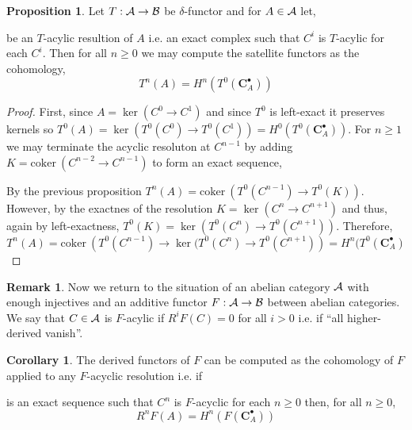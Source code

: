 \documentclass[12pt]{extarticle}
\newcommand{\coker}[1]{\mathrm{coker}\: #1}
\theoremstyle{definition}
\newtheorem{proposition}[theorem]{Proposition}
\newtheorem{corollary}[theorem]{Corollary}
\newtheorem{remark}{Remark}
\renewcommand{\bf}[1]{\mathbf{#1}}
\begin{document}
\begin{proposition}
Let $T : \mathcal{A} \to \mathcal{B}$ be $\delta$-functor and for $A \in \mathcal{A}$ let,
\begin{center}
\end{center}
be an $T$-acylic resultion of $A$ i.e. an exact complex such that $C^i$ is $T$-acylic for each $C^i$. Then for all $n \ge 0$ we may compute the satellite functors as the cohomology,
\[ T^n(A) = H^n(T^0(\bf{C}_A^\bullet)) \]
\end{proposition}

\begin{proof}
First, since $A = \ker{(C^0 \to C^1)}$ and since $T^0$ is left-exact it preserves kernels so $T^0(A) = \ker{(T^0(C^0) \to T^0(C^1))} = H^0(T^0(\bf{C}_A^\bullet))$. For $n \ge 1$ we may terminate the acyclic resoluton at $C^{n-1}$ by adding $K = \coker{(C^{n-2} \to C^{n-1})}$ to form an exact sequence,
\begin{center}
\end{center}
By the previous proposition $T^n(A) = \coker{(T^0(C^{n-1}) \to T^0(K))}$. However, by the exactnes of the resolution $K = \ker{(C^{n} \to C^{n+1})}$ and thus, again by left-exactness, $T^0(K) = \ker{(T^0(C^n) \to T^0(C^{n+1}))}$. Therefore,
\[ T^n(A) = \coker{(T^0(C^{n-1}) \to \ker{(T^0(C^n) \to T^0(C^{n+1})})} =  H^n(T^0(\bf{C}^\bullet_A) \]
\end{proof}

\begin{remark}
Now we return to the situation of an abelian category $\mathcal{A}$ with enough injectives and an additive functor $F : \mathcal{A} \to \mathcal{B}$ between abelian categories. We say that $C \in \mathcal{A}$ is $F$-acylic if $R^i F(C) = 0$ for all $i > 0$ i.e. if ``all higher-derived vanish''. 
\end{remark}

\begin{corollary}
The derived functors of $F$ can be computed as the cohomology of $F$ applied to any $F$-acyclic resolution i.e. if 
\begin{center}
\end{center}
is an exact sequence such that $C^n$ is $F$-acyclic for each $n \ge 0$ then, for all $n \ge 0$,
\[ R^n F(A) = H^n(F(\bf{C}_A^\bullet)) \]
\end{corollary}
\end{document}
